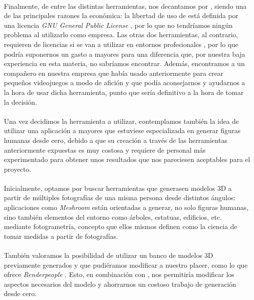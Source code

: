 \documentclass{subfiles}
\begin{document}
    \paragraph{}
    Finalmente, de entre las distintas herramientas, nos decantamos por \blender, siendo una de las principales razones la económica: la libertad de uso de \blender está definida por una licencia \textit{GNU General Public License} \cite{web:blender_license,web:gnulicense}, por lo que no tendríamos ningún problema al utilizarlo como empresa. Las otras dos herramientas, al contrario, requieren de licencias si se van a utilizar en entornos profesionales \cite{web:unity_pricing,web:unreal_licensing}, por lo que podría suponernos un gasto a mayores para una diferencia que, por nuestra baja experiencia en esta materia, no sabríamos encontrar. Además, encontramos a un compañero en nuestra empresa que había usado \blender anteriormente para crear pequeños videojuegos a modo de afición y que podía aconsejarnos y ayudarnos a la hora de usar dicha herramienta, punto que sería definitivo a la hora de tomar la decisión.

    \paragraph{}
    Una vez decidimos la herramienta a utilizar, contemplamos también la idea de utilizar una aplicación a mayores que estuviese especializada en generar figuras humanas desde cero, debido a que su creación a través de las herramientas anteriormente expuestas es muy costosa y requiere de personal más experimentado para obtener unos resultados que nos pareciesen aceptables para el proyecto.
    
    \paragraph{}
    Inicialmente, optamos por buscar herramientas que generasen modelos 3D a partir de múltiples fotografías de una misma persona desde distintos ángulos: aplicaciones como \textit{Meshroom} \cite{web:meshroom} están orientadas a generar, no solo figuras humanas, sino también elementos del entorno como árboles, estatuas, edificios, etc. mediante fotogrametría, concepto que ellos mismos definen como la ciencia de tomar medidas a partir de fotografías.

    \paragraph{}
    También valoramos la posibilidad de utilizar un banco de modelos 3D previamente generados y que pudiéramos modificar a nuestro placer, como lo que ofrece \textit{Renderpeople} \cite{web:renderpeople}. Esto, en combinación con \blender, nos permitiría modificar los aspectos necesarios del modelo y ahorrarnos un costoso trabajo de generación desde cero.
\end{document}
